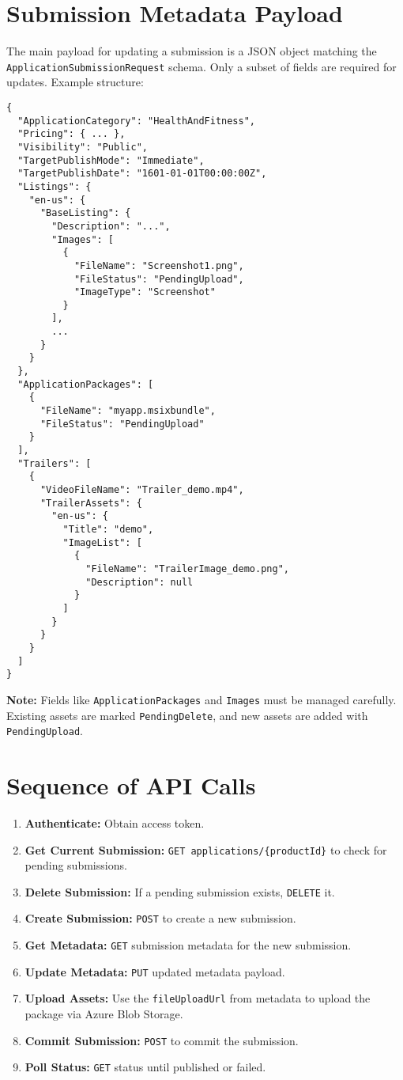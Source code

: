 \documentclass{article}
\begin{document}
\section{Submission Metadata Payload}
The main payload for updating a submission is a JSON object matching the \texttt{ApplicationSubmissionRequest} schema. Only a subset of fields are required for updates. Example structure:
\begin{verbatim}
{
  "ApplicationCategory": "HealthAndFitness",
  "Pricing": { ... },
  "Visibility": "Public",
  "TargetPublishMode": "Immediate",
  "TargetPublishDate": "1601-01-01T00:00:00Z",
  "Listings": {
    "en-us": {
      "BaseListing": {
        "Description": "...",
        "Images": [
          {
            "FileName": "Screenshot1.png",
            "FileStatus": "PendingUpload",
            "ImageType": "Screenshot"
          }
        ],
        ...
      }
    }
  },
  "ApplicationPackages": [
    {
      "FileName": "myapp.msixbundle",
      "FileStatus": "PendingUpload"
    }
  ],
  "Trailers": [
    {
      "VideoFileName": "Trailer_demo.mp4",
      "TrailerAssets": {
        "en-us": {
          "Title": "demo",
          "ImageList": [
            {
              "FileName": "TrailerImage_demo.png",
              "Description": null
            }
          ]
        }
      }
    }
  ]
}
\end{verbatim}
\textbf{Note:} Fields like \texttt{ApplicationPackages} and \texttt{Images} must be managed carefully. Existing assets are marked \texttt{PendingDelete}, and new assets are added with \texttt{PendingUpload}.

\section{Sequence of API Calls}
\begin{enumerate}
    \item \textbf{Authenticate:} Obtain access token.
    \item \textbf{Get Current Submission:} \texttt{GET applications/\{productId\}} to check for pending submissions.
    \item \textbf{Delete Submission:} If a pending submission exists, \texttt{DELETE} it.
    \item \textbf{Create Submission:} \texttt{POST} to create a new submission.
    \item \textbf{Get Metadata:} \texttt{GET} submission metadata for the new submission.
    \item \textbf{Update Metadata:} \texttt{PUT} updated metadata payload.
    \item \textbf{Upload Assets:} Use the \texttt{fileUploadUrl} from metadata to upload the package via Azure Blob Storage.
    \item \textbf{Commit Submission:} \texttt{POST} to commit the submission.
    \item \textbf{Poll Status:} \texttt{GET} status until published or failed.
\end{enumerate}
\end{document}
